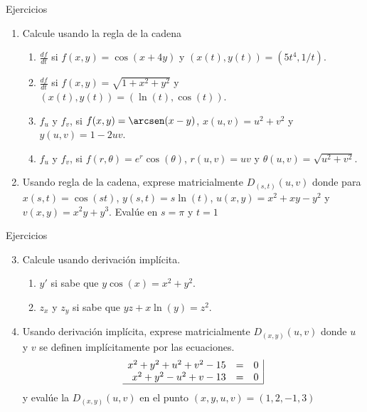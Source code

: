 
\begin{frame}{Ejercicios}
  \vspace{-0.5cm}
  \begin{enumerate}
    \item Calcule usando la regla de la cadena\\[0.25cm]
      \begin{enumerate}
        \item $\frac{df}{dt}$ si $f(x,y)=\cos(x+4y)$ y $(x(t),y(t))=(5t^4,1/t)$.\\[0.25cm]
        \item $\frac{df}{dt}$ si $f(x,y)=\sqrt{1+x^2+y^2}$ y $(x(t),y(t))=(\ln(t),\cos(t))$.\\[0.25cm]
        \item $f_u$ y $f_v$, si $f(x,y)=\arcsen(x-y)$, $x(u,v)=u^2+v^2$ y $y(u,v)=1-2uv$.\\[0.25cm]
        \item $f_u$ y $f_v$, si $f(r,\theta)=e^r\cos(\theta)$, $r(u,v)=uv$ y $\theta(u,v)=\sqrt{u^2+v^2}$.\\[0.25cm]
      \end{enumerate}
    \vspace{5mm}
    \item Usando regla de la cadena, exprese matricialmente $D_{(s,t)}(u,v)$ donde para $x(s,t)=\cos(st)$, $y(s,t)=s\ln(t)$, $u(x,y)=x^2+xy-y^2$ y $v(x,y)= x^2y+y^3$. Evalúe en $s=\pi$ y $t=1$
  \end{enumerate}
\end{frame}

\begin{frame}{Ejercicios}
  \vspace{-0.5cm}
  \begin{enumerate}
    \setcounter{enumi}{2}
    \item Calcule usando derivación implícita.\\[0.25cm]
      \begin{enumerate}
        \item $y'$ si sabe que $y\cos(x)=x^2+y^2$.\\[0.25cm]
        \item $z_x$ y $z_y$ si sabe que $yz+x\ln(y)=z^2$.\\[0.25cm]
      \end{enumerate}
    \vspace{5mm}
    \item Usando derivación implícita, exprese matricialmente $D_{(x,y)}(u,v)$ donde $u$ y $v$ se definen implícitamente por las ecuaciones.
    $$\begin{array}{rcl|}
      x^2+y^2+u^2+v^2-15 & = & 0\\
      x^2+y^2-u^2+v-13   & = & 0\\
      \hline
    \end{array}$$
    y evalúe la $D_{(x,y)}(u,v)$ en el punto $(x,y,u,v)=(1,2,-1,3)$
  \end{enumerate}
\end{frame}

